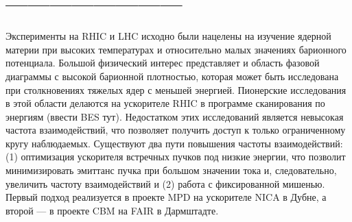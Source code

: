 






\section{------------------------}

Эксперименты на RHIC и LHC исходно были нацелены на изучение ядерной материи при высоких температурах и относительно малых значениях барионного потенциала. Большой физический интерес представляет и область фазовой диаграммы с высокой барионной плотностью, которая может быть исследована при столкновениях тяжелых ядер с меньшей энергией. Пионерские исследования в этой области делаются на ускорителе RHIC в программе сканирования по энергиям (\todo ввести BES тут). Недостатком этих исследований является невысокая частота взаимодействий, что позволяет получить доступ к только ограниченному кругу наблюдаемых. Существуют два пути повышения частоты взаимодействий: (1) оптимизация ускорителя встречных пучков под низкие энергии, что позволит минимизировать эмиттанс пучка при большом значении тока и, следовательно, увеличить частоту взаимодействий и (2) работа с фиксированной мишенью. Первый подход реализуется в проекте MPD на ускорителе NICA в Дубне, а второй --- в проекте CBM на FAIR в Дармштадте.

